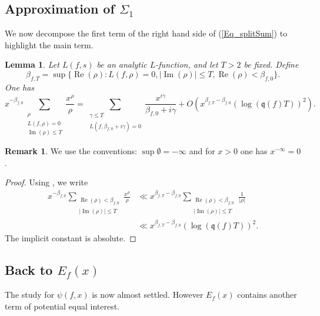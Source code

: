 \documentclass[a4paper,10pt]{amsart}
\theoremstyle{plain}
\newtheorem{lem}[theo]{Lemma}
\theoremstyle{definition}
\newtheorem{Rk}{Remark}
\begin{document}
\subsection{Approximation of $\Sigma_{1}$}

We now decompose the first term of the right hand side of (\ref{Eq_splitSum}) to highlight the main term.

\begin{lem}\label{Lm_beta0}
Let $L(f,s)$ be an analytic $L$-function, and let $T>2$ be fixed.
Define 
$$\beta_{f,T}= \sup\lbrace \operatorname{Re}(\rho) : L(f,\rho)=0, \lvert\operatorname{Im}(\rho)\rvert\leq T, \operatorname{Re}(\rho)<\beta_{f,0} \rbrace.$$
One has
	$$x^{-\beta_{f,0}}\sum_{\substack{ \rho \\ L(f,\rho)=0 \\ \operatorname{Im}(\rho)\leq T}}\frac{x^{\rho}}{\rho} = 
	\sum_{\substack{ \gamma\leq T \\ L(f,\beta_{f,0} + i\gamma)=0}}\frac{x^{i\gamma}}{\beta_{f,0} + i\gamma} + O\left(x^{\beta_{f,T}-\beta_{f,0}}\left(\log(\mathfrak{q}(f)T)\right)^2\right).$$
\end{lem}

\begin{Rk}
We use the conventions: $\sup \emptyset = - \infty$ and for $x>0$ one has $x^{-\infty} = 0$.
\end{Rk}

\begin{proof}
Using \cite[Prop. 5.7.(1)]{IK}, we write
\begin{align*}
        x^{-\beta_{f,0}}\sum_{\substack { \operatorname{Re}(\rho) < \beta_{f,0} \\ \lvert\operatorname{Im}(\rho)\rvert\leq T}}\frac{x^{\rho}}{\rho}
        &\ll  x^{\beta_{f,T}-\beta_{f,0}} \sum_{\substack{ \operatorname{Re}(\rho) < \beta_{f,0} \\ \lvert\operatorname{Im}(\rho)\rvert\leq T}}\frac{1}{\lvert \rho \rvert} \\
        &\ll  x^{\beta_{f,T}-\beta_{f,0}}\left(\log(\mathfrak{q}(f)T)\right)^{2}.
	\end{align*}
	 The implicit constant is absolute.
\end{proof}

\subsection{Back to $E_{f}(x)$}\label{Subsec_ApproxFin}

The study for $\psi(f,x)$ is now almost settled.
However $E_{f}(x)$ contains another term of potential equal interest.
\end{document}
